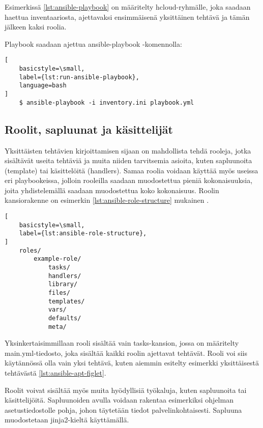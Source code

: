 

Esimerkissä \ref{lst:ansible-playbook} on määritelty hcloud-ryhmälle, joka
saadaan haettua inventaariosta, ajettavaksi ensimmäisenä yksittäinen tehtävä
ja tämän jälkeen kaksi roolia.

Playbook saadaan ajettua ansible-playbook -komennolla:

\begin{lstlisting}[
    basicstyle=\small,
    label={lst:run-ansible-playbook},
    language=bash
]
    $ ansible-playbook -i inventory.ini playbook.yml
\end{lstlisting}

\subsection{Roolit, sapluunat ja käsittelijät}

Yksittäisten tehtävien kirjoittamisen sijaan on mahdollista tehdä rooleja,
jotka sisältävät useita tehtäviä ja muita niiden tarvitsemia asioita, kuten
sapluunoita (template) tai käsittelöitä (handlers). Samaa roolia voidaan
käyttää myös useissa eri playbookeissa, jolloin rooleilla saadaan muodostettua
pieniä kokonaisuuksia, joita yhdistelemällä saadaan muodostettua koko
kokonaisuus. \parencite{JamesFreeman2020PA2} Roolin kansiorakenne on esimerkin
\ref{lst:ansible-role-structure} mukainen \parencite{AnsibleDocs}.

\begin{lstlisting}[
    basicstyle=\small,
    label={lst:ansible-role-structure},
]
    roles/
        example-role/
            tasks/
            handlers/
            library/
            files/
            templates/
            vars/
            defaults/
            meta/
\end{lstlisting}

Yksinkertaisimmillaan rooli sisältää vain tasks-kansion, jossa on määritelty
main.yml-tiedosto, joka sisältää kaikki roolin ajettavat tehtävät. Rooli
voi siis käytännössä olla vain yksi tehtävä, kuten aiemmin esitelty esimerkki
yksittäisestä tehtävästä \ref{lst:ansible-apt-figlet}.

Roolit voivat sisältää myös muita hyödyllisiä työkaluja, kuten sapluunoita tai
käsittelijöitä. Sapluunoiden avulla voidaan rakentaa esimerkiksi ohjelman
asetustiedostolle pohja, johon täytetään tiedot palvelinkohtaisesti. Sapluuna
muodostetaan jinja2-kieltä käyttämällä. \parencite{JamesFreeman2020PA2}

